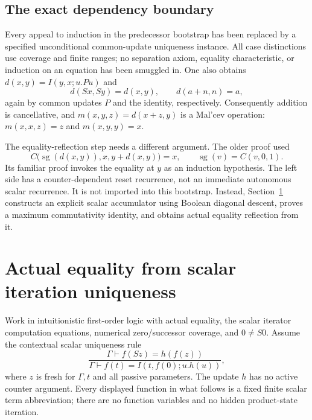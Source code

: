 \documentclass[11pt]{article}
\begin{document}
\subsection{The exact dependency boundary}
Every appeal to induction in the predecessor bootstrap has been replaced
by a specified unconditional common-update uniqueness instance.  All case
distinctions use coverage and finite ranges; no separation axiom, equality
characteristic, or induction on an equation has been smuggled in.
One also obtains $d(x,y)=I(y,x;u.Pu)$ and
\[
 d(Sx,Sy)=d(x,y),\qquad d(a+n,n)=a,
\]
again by common updates $P$ and the identity, respectively.
Consequently addition is cancellative, and
$m(x,y,z)=d(x+z,y)$ is a Mal'cev operation:
$m(x,x,z)=z$ and $m(x,y,y)=x$.

The equality-reflection step needs a different argument.  The older
proof used
\[
 C\bigl(\operatorname{sg}(d(x,y)),x,y+d(x,y)\bigr)=x,
 \qquad \operatorname{sg}(v)=C(v,0,1).
\]
Its familiar proof invokes the equality at $y$ as an induction hypothesis.
The left side has a counter-dependent reset recurrence, not an immediate
autonomous scalar recurrence.  It is not imported into this bootstrap.
Instead, Section~\ref{sec:ur-reflection-completion} constructs an explicit
scalar accumulator using Boolean diagonal descent, proves a maximum
commutativity identity, and obtains actual equality reflection from it.




\section{Actual equality from scalar iteration uniqueness}
\label{sec:ur-reflection-completion}

Work in intuitionistic first-order logic with actual equality, the scalar
iterator computation equations, numerical zero/successor coverage, and
$0\ne S0$. Assume the contextual scalar uniqueness rule
\[
 \frac{\Gamma\vdash f(Sz)=h(f(z))}
      {\Gamma\vdash f(t)=I(t,f(0);u.h(u))},
 \tag{UR}
\]
where $z$ is fresh for $\Gamma,t$ and all passive parameters. The update
$h$ has no active counter argument. Every displayed function in what
follows is a fixed finite scalar term abbreviation; there are no function
variables and no hidden product-state iteration.
\end{document}

